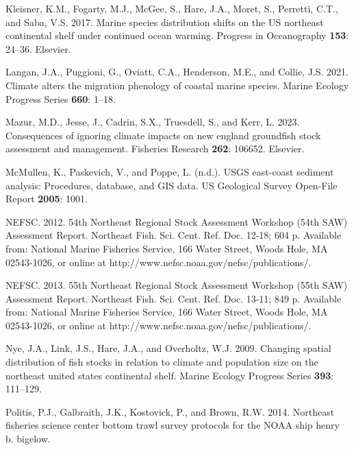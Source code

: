 \documentclass[
  12pt,
]{article}
\newlength{\cslhangindent}
\newlength{\cslentryspacingunit} %
\newenvironment{CSLReferences}[2] %
 {%
  \setlength{\parindent}{0pt}
  \ifodd #1
  \let\oldpar\par
  \def\par{\hangindent=\cslhangindent\oldpar}
  \fi
  \setlength{\parskip}{#2\cslentryspacingunit}
 }%
 {}
\begin{document}
\begin{CSLReferences}{1}{0}
\leavevmode{}%
Kleisner, K.M., Fogarty, M.J., McGee, S., Hare, J.A., Moret, S., Perretti, C.T., and Saba, V.S. 2017. Marine species distribution shifts on the US northeast continental shelf under continued ocean warming. Progress in Oceanography \textbf{153}: 24--36. Elsevier.

\leavevmode{}%
Langan, J.A., Puggioni, G., Oviatt, C.A., Henderson, M.E., and Collie, J.S. 2021. Climate alters the migration phenology of coastal marine species. Marine Ecology Progress Series \textbf{660}: 1--18.

\leavevmode{}%
Mazur, M.D., Jesse, J., Cadrin, S.X., Truesdell, S., and Kerr, L. 2023. Consequences of ignoring climate impacts on new england groundfish stock assessment and management. Fisheries Research \textbf{262}: 106652. Elsevier.

\leavevmode{}%
McMullen, K., Paskevich, V., and Poppe, L. (n.d.). USGS east-coast sediment analysis: Procedures, database, and GIS data. US Geological Survey Open-File Report \textbf{2005}: 1001.

\leavevmode{}%
NEFSC. 2012. {54th Northeast Regional Stock Assessment Workshop (54th SAW) Assessment Report}. {Northeast Fish. Sci. Cent. Ref. Doc. 12-18; 604 p. Available from: National Marine Fisheries Service, 166 Water Street, Woods Hole, MA 02543-1026, or online at http://www.nefsc.noaa.gov/nefsc/publications/}.

\leavevmode{}%
NEFSC. 2013. {55th Northeast Regional Stock Assessment Workshop (55th SAW) Assessment Report}. {Northeast Fish. Sci. Cent. Ref. Doc. 13-11; 849 p. Available from: National Marine Fisheries Service, 166 Water Street, Woods Hole, MA 02543-1026, or online at http://www.nefsc.noaa.gov/nefsc/publications/}.

\leavevmode{}%
Nye, J.A., Link, J.S., Hare, J.A., and Overholtz, W.J. 2009. Changing spatial distribution of fish stocks in relation to climate and population size on the northeast united states continental shelf. Marine Ecology Progress Series \textbf{393}: 111--129.

\leavevmode{}%
Politis, P.J., Galbraith, J.K., Kostovick, P., and Brown, R.W. 2014. Northeast fisheries science center bottom trawl survey protocols for the NOAA ship henry b. bigelow.


\end{CSLReferences}
\end{document}
